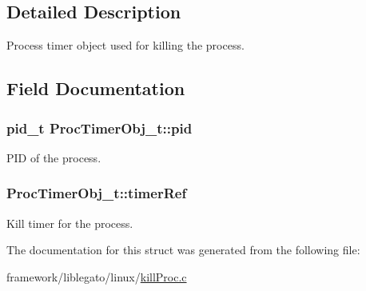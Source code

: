 \subsection{Detailed Description}
Process timer object used for killing the process. 

\subsection{Field Documentation}
\subsubsection[{\texorpdfstring{pid}{pid}}]{\setlength{\rightskip}{0pt plus 5cm}pid\+\_\+t Proc\+Timer\+Obj\+\_\+t\+::pid}\hypertarget{struct_proc_timer_obj__t_ae55399add0cda13944b5f6e0a043593d}{}\label{struct_proc_timer_obj__t_ae55399add0cda13944b5f6e0a043593d}


P\+ID of the process. 

\subsubsection[{\texorpdfstring{timer\+Ref}{timerRef}}]{ Proc\+Timer\+Obj\+\_\+t\+::timer\+Ref}\hypertarget{struct_proc_timer_obj__t_a9350c951e08e9f46914f55168b21e936}{}\label{struct_proc_timer_obj__t_a9350c951e08e9f46914f55168b21e936}


Kill timer for the process. 



The documentation for this struct was generated from the following file\+:\begin{DoxyCompactItemize}
\item 
framework/liblegato/linux/\hyperlink{kill_proc_8c}{kill\+Proc.\+c}\end{DoxyCompactItemize}
